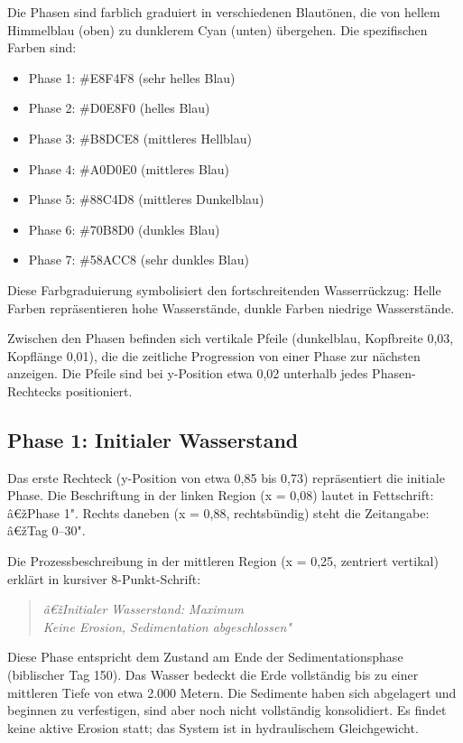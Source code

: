 ﻿\documentclass[12pt,a4paper]{report}
\begin{document}
Die Phasen sind farblich graduiert in verschiedenen Blautönen, die von hellem Himmelblau (oben) zu dunklerem Cyan (unten) übergehen. Die spezifischen Farben sind:
\begin{itemize}
	\item Phase 1: \#E8F4F8 (sehr helles Blau)
	\item Phase 2: \#D0E8F0 (helles Blau)
	\item Phase 3: \#B8DCE8 (mittleres Hellblau)
	\item Phase 4: \#A0D0E0 (mittleres Blau)
	\item Phase 5: \#88C4D8 (mittleres Dunkelblau)
	\item Phase 6: \#70B8D0 (dunkles Blau)
	\item Phase 7: \#58ACC8 (sehr dunkles Blau)
\end{itemize}

Diese Farbgraduierung symbolisiert den fortschreitenden Wasserrückzug: Helle Farben repräsentieren hohe Wasserstände, dunkle Farben niedrige Wasserstände.

Zwischen den Phasen befinden sich vertikale Pfeile (dunkelblau, Kopfbreite 0,03, Kopf\-länge 0,01), die die zeitliche Progression von einer Phase zur nächsten anzeigen. Die Pfeile sind bei y-Position etwa 0,02 unterhalb jedes Phasen-Rechtecks positioniert.

\subsection{Phase 1: Initialer Wasserstand}

Das erste Rechteck (y-Position von etwa 0,85 bis 0,73) repräsentiert die initiale Phase. Die Beschriftung in der linken Region (x = 0,08) lautet in Fettschrift: â€žPhase 1". Rechts daneben (x = 0,88, rechtsbündig) steht die Zeitangabe: â€žTag 0--30".

Die Prozessbeschreibung in der mittleren Region (x = 0,25, zentriert vertikal) erklärt in kursiver 8-Punkt-Schrift:
\begin{quote}
	\textit{â€žInitialer Wasserstand: Maximum\\
		Keine Erosion, Sedimentation abgeschlossen"}
\end{quote}

Diese Phase entspricht dem Zustand am Ende der Sedimentationsphase (biblischer Tag 150). Das Wasser bedeckt die Erde vollständig bis zu einer mittleren Tiefe von etwa 2.000 Metern. Die Sedimente haben sich abgelagert und beginnen zu verfestigen, sind aber noch nicht vollständig konsolidiert. Es findet keine aktive Erosion statt; das System ist in hydraulischem Gleichgewicht.
\end{document}
